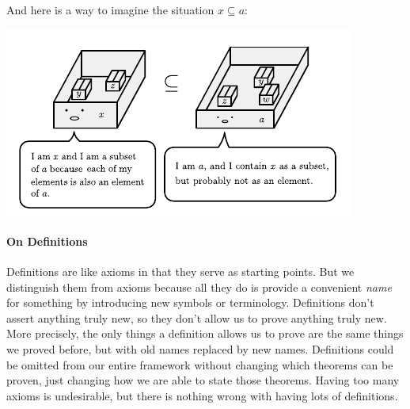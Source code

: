 \documentclass[12pt]{article}
\newcounter{theorem}
\begin{document}
\begin{samepage}
And here is a way to imagine the situation $x\subseteq a$:
\begin{center}
\includegraphics[scale=1.5]{img/boxes/2.pdf}
\end{center}
\end{samepage}

\paragraph{On Definitions}
Definitions are like axioms in that they serve as starting points.
But we distinguish them from axioms because all they do is provide a convenient \emph{name}
for something by introducing new symbols or terminology.
Definitions don't assert anything truly new, so they don't allow us to prove anything truly new.
More precisely, the only things a definition allows us to prove are the same things we proved before, but with old names
replaced by new names.
Definitions could be omitted from our entire framework without changing which theorems can be proven, just changing
how we are able to state those theorems.
Having too many axioms is undesirable, but there is nothing wrong with having lots of definitions.
\end{document}
